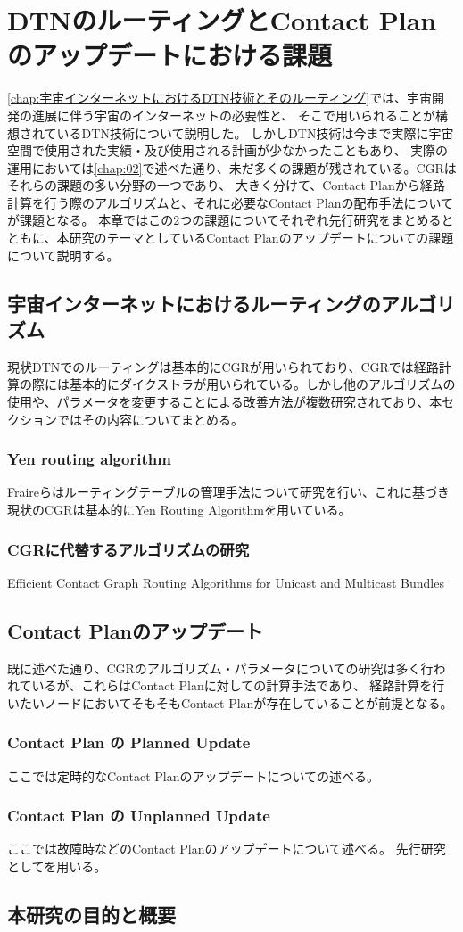 \chapter{DTNのルーティングとContact Planのアップデートにおける課題}

\label{chap:03}
\ref{chap:宇宙インターネットにおけるDTN技術とそのルーティング}では、宇宙開発の進展に伴う宇宙のインターネットの必要性と、
そこで用いられることが構想されているDTN技術について説明した。
しかしDTN技術は今まで実際に宇宙空間で使用された実績・及び使用される計画が少なかったこともあり、
実際の運用においては\ref{chap:02}で述べた通り、未だ多くの課題が残されている。CGRはそれらの課題の多い分野の一つであり、
大きく分けて、Contact Planから経路計算を行う際のアルゴリズムと、それに必要なContact Planの配布手法についてが課題となる。
本章ではこの2つの課題についてそれぞれ先行研究をまとめるとともに、本研究のテーマとしているContact Planのアップデートについての課題について説明する。

\section{宇宙インターネットにおけるルーティングのアルゴリズム}
現状DTNでのルーティングは基本的にCGRが用いられており、CGRでは経路計算の際には基本的にダイクストラが用いられている。しかし他のアルゴリズムの使用や、パラメータを変更することによる改善方法が複数研究されており、本セクションではその内容についてまとめる。
\subsection{Yen routing algorithm}
Fraireらはルーティングテーブルの管理手法について研究を行い、これに基づき現状のCGRは基本的にYen Routing Algorithmを用いている。\cite{FRAIRE2018}

\subsection{CGRに代替するアルゴリズムの研究}
Efficient Contact Graph Routing Algorithms for Unicast and Multicast Bundles\cite{DeJonckere2019}
\section{Contact Planのアップデート}
既に述べた通り、CGRのアルゴリズム・パラメータについての研究は多く行われているが、これらはContact Planに対しての計算手法であり、
経路計算を行いたいノードにおいてそもそもContact Planが存在していることが前提となる。
\subsection{Contact Plan の Planned Update}
ここでは定時的なContact Planのアップデートについての述べる。
\subsection{Contact Plan の Unplanned Update}
ここでは故障時などのContact Planのアップデートについて述べる。
先行研究として\cite{Bezirgiannidis2013}を用いる。
\section{本研究の目的と概要}